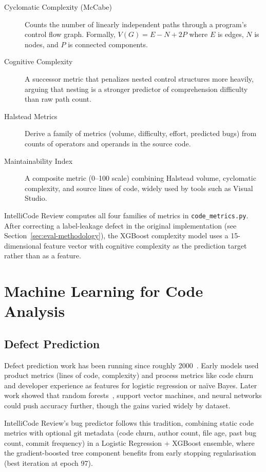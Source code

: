 \documentclass[12pt, oneside]{report}
\begin{document}
\begin{description}
  \item[Cyclomatic Complexity (McCabe)~\cite{mccabe1976}] Counts the number of linearly
    independent paths through a program's control flow graph. Formally, $V(G) = E - N + 2P$
    where $E$ is edges, $N$ is nodes, and $P$ is connected components.
  \item[Cognitive Complexity~\cite{campbell2018}] A successor metric that penalizes
    nested control structures more heavily, arguing that nesting is a stronger predictor
    of comprehension difficulty than raw path count.
  \item[Halstead Metrics~\cite{halstead1977}] Derive a family of metrics (volume, difficulty,
    effort, predicted bugs) from counts of operators and operands in the source code.
  \item[Maintainability Index~\cite{oman1992}] A composite metric (0--100 scale) combining
    Halstead volume, cyclomatic complexity, and source lines of code, widely used by
    tools such as Visual Studio.
\end{description}

IntelliCode Review computes all four families of metrics in \texttt{code\_metrics.py}.
After correcting a label-leakage defect in the original implementation (see
Section~\ref{sec:eval-methodology}), the XGBoost complexity model uses a 15-dimensional
feature vector with cognitive complexity as the prediction target rather than as a feature.

\section{Machine Learning for Code Analysis}
\label{sec:bg-ml}

\subsection{Defect Prediction}

Defect prediction work has been running since roughly 2000~\cite{nagappan2005, zimmermann2007}.
Early models used product metrics (lines of code, complexity) and process metrics like code churn and developer experience as features for logistic regression or na\"ive Bayes.
Later work showed that random forests~\cite{lessmann2008}, support vector machines, and
neural networks could push accuracy further, though the gains varied widely by dataset.

IntelliCode Review's bug predictor follows this tradition, combining static code metrics
with optional git metadata (code churn, author count, file age, past bug count, commit
frequency) in a Logistic Regression + XGBoost ensemble, where the gradient-boosted tree
component benefits from early stopping regularisation (best iteration at epoch 97).
\end{document}

